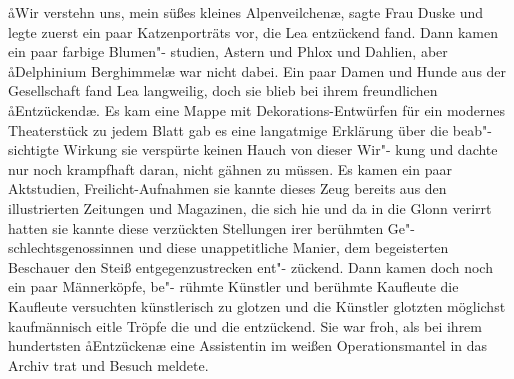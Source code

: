 \aa{}Wir verstehn uns, mein süßes kleines Alpenveilchen\ae{}, sagte
Frau Duske und legte zuerst ein paar Katzenporträts vor, die
Lea entzückend fand. Dann kamen ein paar farbige Blumen"-%
studien, Astern und Phlox und Dahlien, aber \aa{}Delphinium
Berghimmel\ae{} war nicht dabei. Ein paar Damen und Hunde
aus der Gesellschaft fand Lea langweilig, doch sie blieb bei
ihrem freundlichen \aa{}Entzückend\ae{}. Es kam eine Mappe mit
Dekorations-Entwürfen für ein modernes Theaterstück\semi{} zu
jedem Blatt gab es eine langatmige Erklärung über die beab"-%
sichtigte Wirkung\semi{} sie verspürte keinen Hauch von dieser Wir"-%
kung und dachte nur noch krampfhaft daran, nicht gähnen zu
müssen. Es kamen ein paar Aktstudien, Freilicht-Aufnahmen\semi{}
sie kannte dieses Zeug bereits aus den illustrierten Zeitungen
und Magazinen, die sich hie und da in die Glonn verirrt hatten\semi{}
sie kannte diese verzückten Stellungen irer berühmten Ge"-%
schlechtsgenossinnen und diese unappetitliche Manier, dem
begeisterten Beschauer den Steiß entgegenzustrecken\dopp{} ent"-%
zückend. Dann kamen doch noch ein paar Männerköpfe, be"-%
rühmte Künstler und berühmte Kaufleute\semi{} die Kaufleute
versuchten künstlerisch zu glotzen und die Künstler glotzten
möglichst kaufmännisch\semi{} eitle Tröpfe die und die\dopp{} entzückend.
Sie war froh, als bei ihrem hundertsten \aa{}Entzücken\ae{} eine
Assistentin im weißen Operationsmantel in das Archiv trat
und Besuch meldete.

